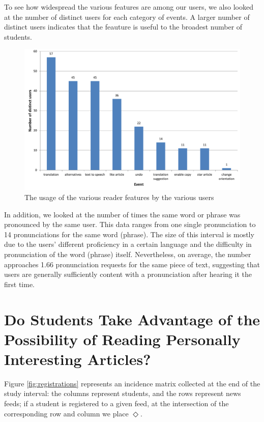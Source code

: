 To see how widespread the various features are among our users, we also looked at the number of distinct users for each category of events. A larger number of distinct users indicates that the feauture is useful to the broadest number of students.

\begin{figure}[h!]
\centering
  \includegraphics[width=0.7\columnwidth]{figures/reader_feature_usage_per_user}
  \caption{The usage of the various reader features by the various users }
\end{figure}

In addition, we looked at the number of times the same word or phrase was pronounced by the same user. This data ranges from one single pronunciation to 14 pronunciations for the same word (phrase). The size of this interval is mostly due to the users' different proficiency in a certain language and the difficulty in pronunciation of the word (phrase) itself. Nevertheless, on average, the number approaches 1.66 pronunciation requests for the same
piece of text, suggesting that users are generally sufficiently content with a pronunciation after hearing it the first time.



\newpage
\section{Do Students Take Advantage of the Possibility of Reading Personally Interesting Articles?}
\label{sec:results}

Figure \ref{fig:registrations} represents an incidence matrix collected at the end of the study interval: the columns represent students, and the rows represent news feeds; if a student is registered to a given feed, at the intersection of the corresponding row and column we place $\Diamond$. 

